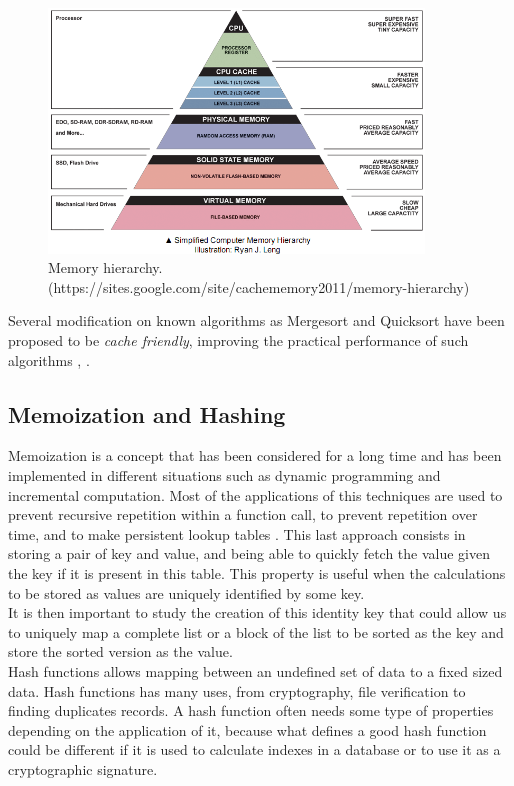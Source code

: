 \documentclass[a4paper,12pt]{article}
\begin{document}
\begin{figure}[H]
\centering
\includegraphics[height=6.5cm,keepaspectratio]{./images/ComputerMemoryHierarchy.png}
\caption{Memory hierarchy. (https://sites.google.com/site/cachememory2011/memory-hierarchy)}
\label{fig:Memory}
\end{figure}

Several modification on known algorithms as Mergesort and Quicksort have been proposed to be {\it cache friendly}, improving the practical performance of such algorithms \cite{lamarca1999influence},  \cite{xiao2000improving}.


\subsection{Memoization and Hashing}

Memoization is a concept that has been considered for a long time and has been implemented in different situations \cite{acar2003selective} such as dynamic programming and incremental computation. Most of the applications of this techniques are used to prevent recursive repetition within a function call, to prevent repetition over time, and to
make persistent lookup tables \cite{hall1997improving}. This last approach consists in storing a pair of key and value, and being able to quickly fetch the value given the key if it is present in this table. This property is useful when the calculations to be stored as values are uniquely identified by some key. \\

It is then important to study the creation of this identity key that could allow us to uniquely map a complete list or a block of the list to be sorted as the key and store the sorted version as the value. \\

Hash functions allows mapping between an undefined set of data to a fixed sized data. Hash functions has many uses, from cryptography, file verification to finding duplicates records. A hash function often needs some type of properties depending on the application of it, because what defines a good hash function could be different if it is used to calculate indexes in a database or to use it as a cryptographic signature. \\
\end{document}
